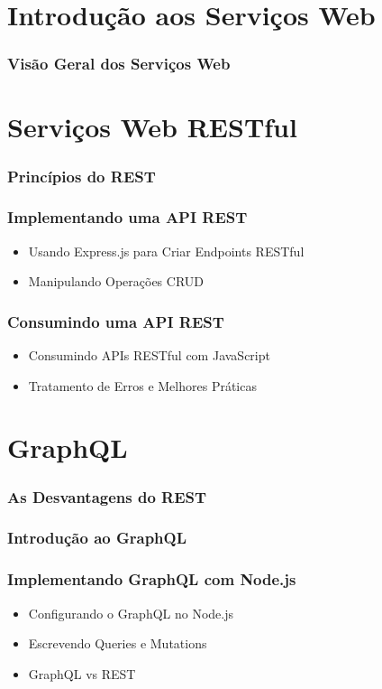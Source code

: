 \section{Introdução aos Serviços Web}

\subsubsection{Visão Geral dos Serviços Web}


\section{Serviços Web RESTful}

\subsubsection{Princípios do REST}
\subsubsection{Implementando uma API REST}
\begin{itemize}
\item Usando Express.js para Criar Endpoints RESTful
\item Manipulando Operações CRUD
\end{itemize}
\subsubsection{Consumindo uma API REST}
\begin{itemize}
\item Consumindo APIs RESTful com JavaScript
\item Tratamento de Erros e Melhores Práticas
\end{itemize}


\section{GraphQL}

\subsubsection{As Desvantagens do REST}
\subsubsection{Introdução ao GraphQL}
\subsubsection{Implementando GraphQL com Node.js}
\begin{itemize}
\item Configurando o GraphQL no Node.js
\item Escrevendo Queries e Mutations
\item GraphQL vs REST
\end{itemize}












